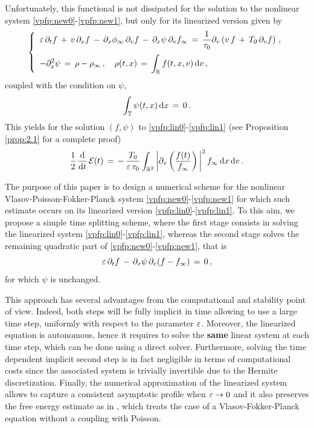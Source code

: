 \documentclass[11pt]{amsart}
\numberwithin{equation}{section}
\numberwithin{figure}{section}
\begin{document}
Unfortunately, this functional is not dissipated for the solution to
the nonlinear system \eqref{vpfp:new0}-\eqref{vpfp:new1}, but only
for its linearized version given by 
\begin{equation}
\label{vpfp:lin0}
\left\{
\begin{array}{l}
	\displaystyle\varepsilon\,\partial_t f \,+\, v\,\partial_x f
	\,-\,\partial_{x}\phi_{\infty} \,\partial_v f 
	\,-\,\partial_{x}\psi \,\partial_v f_\infty 
	\,=\,\frac{1}{\tau_0}
	\partial_v \left( v \, f \,+\, T_0\,\partial_v f \right)\,,
	\\[1.1em]
	\displaystyle-\partial_{x}^2\psi \,=\, \rho-\rho_{\infty}\,,\quad \rho(t,x)\,=\,\int_{{\mathbb R}}f(t,x,v)\,\mathrm{d} v\,,
\end{array}\right.
\end{equation}
coupled with the condition on $\psi$,
 \begin{equation}
	\label{vpfp:lin1}
\int_{\mathbb T} \psi(t,x) \,\mathrm{d} x\,=\, 0\,.
\end{equation}
This yields for the solution $(f,\psi)$ to \eqref{vpfp:lin0}-\eqref{vpfp:lin1} (see Proposition \ref{prop:2.1} for a complete proof)
\begin{equation}\label{key:estimate}
\frac{1}{2}\,\frac{\mathrm{d}}{\mathrm{d} t}\,
{\mathcal E}(t)
\,=\,
-\,\frac{T_0}{\varepsilon\,\tau_0}
\int_{{\mathbb R}^2} \left|
\partial_v
\left(\frac{f(t)}{f_{\infty}}\right)\,
\right|^2
f_{\infty}\, \mathrm{d} x\,\mathrm{d} v\,.
\end{equation}


The purpose of this paper is to design a numerical scheme for the
nonlinear Vlasov-Poisson-Fokker-Planck system
\eqref{vpfp:new0}-\eqref{vpfp:new1} for which such estimate occurs on its linearized version \eqref{vpfp:lin0}-\eqref{vpfp:lin1}. To this aim, we propose a simple time
splitting scheme, where the first stage consists in solving the linearized
system \eqref{vpfp:lin0}-\eqref{vpfp:lin1}, whereas the second
stage solves the remaining quadratic part of \eqref{vpfp:new0}-\eqref{vpfp:new1}, that is
\begin{equation*}
			\varepsilon\,\partial_t f  \,-\,\partial_{x}\psi \,\partial_v (f - f_\infty) \,=\,0\,,
\end{equation*}
for which $\psi$ is unchanged.


This approach has several advantages from the computational and
stability point of view. Indeed, both steps will be fully implicit in time allowing to use a large time step, uniformly with respect to the parameter $\varepsilon$. Moreover, the linearized equation is autonomous, hence it requires to solve the \textbf{same} linear system at each time step, which can be done using a direct solver. Furthermore, solving the time dependent implicit second step is in fact negligible in terms of computational costs since the associated system is trivially invertible due to the Hermite discretization.
Finally, the numerical approximation of the linearized system allows to capture a consistent asymptotic profile when $\varepsilon\rightarrow 0$ and it also preserves the free energy estimate as in \cite{BF_09_22}, which treats the case of a Vlasov-Fokker-Planck equation without a coupling with Poisson. 
\end{document}
